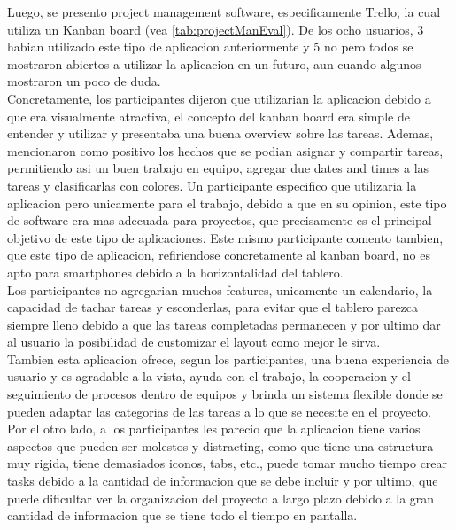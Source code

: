 Luego, se presento project management software, especificamente Trello, la cual utiliza un Kanban board (vea \ref{tab:projectManEval}). De los ocho usuarios, 3 habian utilizado este tipo de aplicacion anteriormente y 5 no pero todos se mostraron abiertos a utilizar la aplicacion en un futuro, aun cuando algunos mostraron un poco de duda. \\
Concretamente, los participantes dijeron que utilizarian la aplicacion debido a que era visualmente atractiva, el concepto del kanban board era simple de entender y utilizar y presentaba una buena overview sobre las tareas. Ademas, mencionaron como positivo los hechos que se podian asignar y compartir tareas, permitiendo asi un buen trabajo en equipo, agregar due dates and times a las tareas y clasificarlas con colores. Un participante especifico que utilizaria la aplicacion pero unicamente para el trabajo, debido a que en su opinion, este tipo de software era mas adecuada para proyectos, que precisamente es el principal objetivo de este tipo de aplicaciones. Este mismo participante comento tambien, que este tipo de aplicacion, refiriendose concretamente al kanban board, no es apto para smartphones debido a la horizontalidad del tablero.\\
Los participantes no agregarian muchos features, unicamente un calendario, la capacidad de tachar tareas y esconderlas, para evitar que el tablero parezca siempre lleno debido a que las tareas completadas permanecen y por ultimo dar al usuario la posibilidad de customizar el layout como mejor le sirva.\\
Tambien esta aplicacion ofrece, segun los participantes, una buena experiencia de usuario y es agradable a la vista, ayuda con el trabajo, la cooperacion y el seguimiento de procesos dentro de equipos y brinda un sistema flexible donde se pueden adaptar las categorias de las tareas a lo que se necesite en el proyecto. Por el otro lado, a los participantes les parecio que la aplicacion tiene varios aspectos que pueden ser molestos y distracting, como que tiene una estructura muy rigida, tiene demasiados iconos, tabs, etc., puede tomar mucho tiempo crear tasks debido a la cantidad de informacion que se debe incluir y por ultimo, que puede dificultar ver la organizacion del proyecto a largo plazo debido a la gran cantidad de informacion que se tiene todo el tiempo en pantalla.

